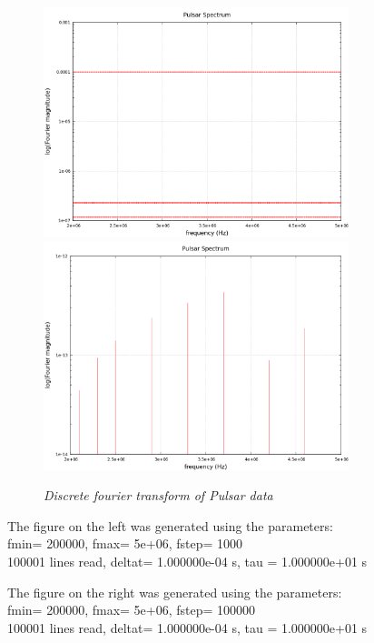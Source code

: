 \documentclass[11pt]{article}
\begin{document}
\begin{figure}[H]
 \centerline{\includegraphics[width=3.5in]{Pulsar12.png}\includegraphics[width=3.5in]{Pulsar22.png}}
\caption{\it \small{Discrete fourier transform of Pulsar data \label{fig5}}}
\end{figure}
The figure on the left was generated using the parameters:\\
fmin= 200000, fmax= 5e+06, fstep= 1000\\
100001 lines read, deltat= 1.000000e-04 s, tau = 1.000000e+01 s



The figure on the right was generated using the parameters:\\
fmin= 200000, fmax= 5e+06, fstep= 100000\\
100001 lines read, deltat= 1.000000e-04 s, tau = 1.000000e+01 s
 ~\\
 ~\\
 ~\\
 ~\\
 ~\\
\end{document}

